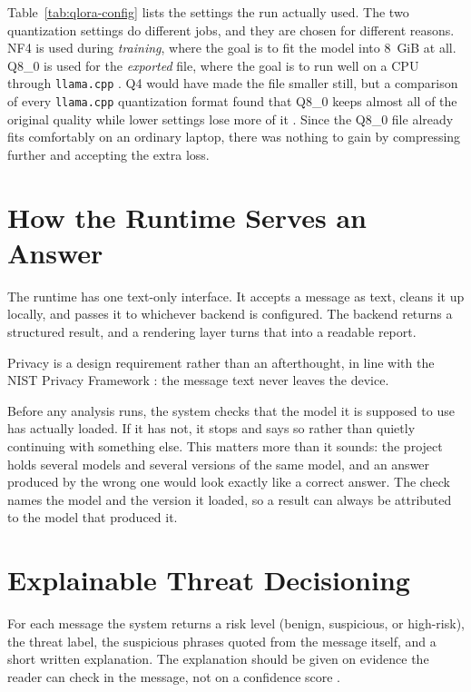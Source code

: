 

Table~\ref{tab:qlora-config} lists the settings the run actually used. The two quantization settings do different jobs, and they are chosen for different reasons. NF4 is used during \textit{training}, where the goal is to fit the model into 8~GiB at all. Q8\_0 is used for the \textit{exported} file, where the goal is to run well on a CPU through \texttt{llama.cpp} \cite{gerganov2023llamacpp}. Q4 would have made the file smaller still, but a comparison of every \texttt{llama.cpp} quantization format found that Q8\_0 keeps almost all of the original quality while lower settings lose more of it \cite{kurt2026quantization}. Since the Q8\_0 file already fits comfortably on an ordinary laptop, there was nothing to gain by compressing further and accepting the extra loss.

\section{How the Runtime Serves an Answer}

The runtime has one text-only interface. It accepts a message as text, cleans it up locally, and passes it to whichever backend is configured. The backend returns a structured result, and a rendering layer turns that into a readable report.

Privacy is a design requirement rather than an afterthought, in line with the NIST Privacy Framework \cite{nist2026privacyframework}: the message text never leaves the device.

Before any analysis runs, the system checks that the model it is supposed to use has actually loaded. If it has not, it stops and says so rather than quietly continuing with something else. This matters more than it sounds: the project holds several models and several versions of the same model, and an answer produced by the wrong one would look exactly like a correct answer. The check names the model and the version it loaded, so a result can always be attributed to the model that produced it.

\section{Explainable Threat Decisioning}
\label{sec:explainable-decisioning}

For each message the system returns a risk level (benign, suspicious, or high-risk), the threat label, the suspicious phrases quoted from the message itself, and a short written explanation. The explanation should be given on evidence the reader can check in the message, not on a confidence score \cite{rjoub2023surveyxai}.

